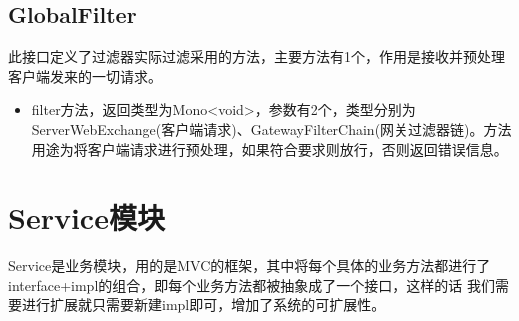 \subsection{GlobalFilter}
此接口定义了过滤器实际过滤采用的方法，主要方法有1个，作用是接收并预处理客户端发来的一切请求。
\begin{itemize}
    \item filter方法，返回类型为Mono<void>，参数有2个，类型分别为ServerWebExchange(客户端请求)、GatewayFilterChain(网关过滤器链)。方法用途为将客户端请求进行预处理，如果符合要求则放行，否则返回错误信息。
\end{itemize}

\section{Service模块}
Service是业务模块，用的是MVC的框架，其中将每个具体的业务方法都进行了interface+impl的组合，即每个业务方法都被抽象成了一个接口，这样的话
我们需要进行扩展就只需要新建impl即可，增加了系统的可扩展性。

